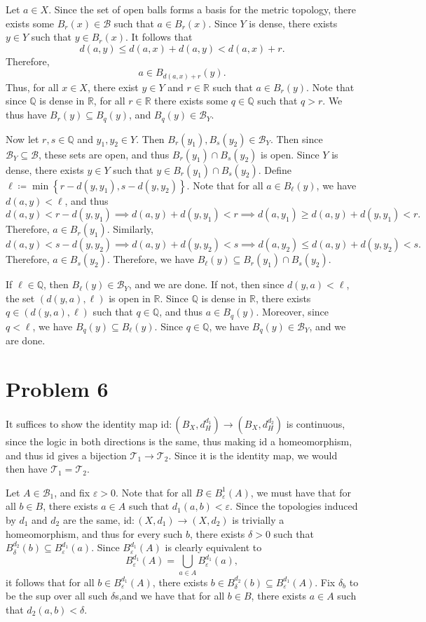 \documentclass[11pt, letterpaper]{article}
\begin{document}
Let $a\in X$. Since the set of open balls forms a basis for the metric topology, there exists some $B_r(x)\in \mathcal{B} $ such that $a\in B_r(x)$. Since $Y$ is dense, there exists $y\in Y$ such that $y\in B_r(x)$. It follows that
\[
	d(a,y)\leq d(a,x)+d(a,y)<d(a,x)+r
.\]
Therefore,
\[
	a\in B_{d(a,x)+r} (y)
.\]
Thus, for all $x\in X$, there exist $y\in Y$ and $r\in\mathbb{R} $ such that $a\in B_r(y)$. Note that since $\mathbb{Q} $ is dense in $\mathbb{R} $, for all $r\in \mathbb{R} $ there exists some $q\in\mathbb{Q} $ such that $q>r$. We thus have $B_r(y)\subseteq B_q(y)$, and $B_q(y)\in \mathcal{B}_Y$.

Now let $r,s\in\mathbb{Q} $ and $y_1,y_2\in Y$. Then $B_r(y_1),B_s(y_2)\in \mathcal{B} _Y$. Then since $\mathcal{B}_Y \subseteq \mathcal{B} $, these sets are open, and thus $B_r(y_1)\cap B_s(y_2)$ is open. Since $Y$ is dense, there exists $y\in Y$ such that $y\in B_r(y_1)\cap B_s(y_2)$. Define $\ell \coloneqq \min \left\{ r-d(y,y_1),s-d(y,y_2) \right\} $. Note that for all $a\in B_\ell (y)$, we have $d(a,y)<\ell $, and thus
\[
	d(a,y)<r-d(y,y_1)\implies d(a,y)+d(y,y_1)<r\implies d(a,y_1)\geq d(a,y)+d(y,y_1)<r
.\]
Therefore, $a\in B_r(y_1)$. Similarly,
\[
	d(a,y)<s-d(y,y_2)\implies d(a,y)+d(y,y_2)<s\implies d(a,y_2)\leq d(a,y)+d(y,y_2)<s
.\]
Therefore, $a\in B_s(y_2)$. Therefore, we have $B_\ell (y)\subseteq B_r(y_1)\cap B_s(y_2)$.

If $\ell \in\mathbb{Q} $, then $B_\ell (y)\in \mathcal{B}_Y$, and we are done. If not, then since $d(y,a)<\ell $, the set $(d(y,a),\ell )$ is open in $\mathbb{R} $. Since $\mathbb{Q} $ is dense in $\mathbb{R} $, there exists $q\in (d(y,a),\ell )$ such that $q\in\mathbb{Q} $, and thus $a\in B_q(y)$. Moreover, since $q<\ell $, we have $B_q(y)\subseteq B_\ell (y)$. Since $q\in\mathbb{Q} $, we have $B_q(y)\in \mathcal{B}_Y$, and we are done.
\section*{Problem 6}
It suffices to show the identity map $\mathrm{id} : \left(B_X,d_H^{d_1} \right) \to \left( B_X,d_H^{d_2}  \right) $ is continuous, since the logic in both directions is the same, thus making $\mathrm{id} $ a homeomorphism, and thus $\mathrm{id} $ gives a bijection $\mathcal{T}_1 \to \mathcal{T}_2$. Since it is the identity map, we would then have $\mathcal{T}_1 =\mathcal{T} _2$.

Let $A\in \mathcal{B}_1$, and fix $\varepsilon >0$. Note that for all $B\in B_\varepsilon^1(A)$, we must have that for all $b\in B$, there exists $a\in A$ such that $d_1(a,b)<\varepsilon $. Since the topologies induced by $d_1$ and $d_2$ are the same, $\mathrm{id} : (X,d_1) \to (X,d_2)$ is trivially a homeomorphism, and thus for every such $b$, there exists $\delta >0$ such that $B_\delta^{d_2} (b)\subseteq B_\varepsilon^{d_1} (a)$. Since $B_\varepsilon^{d_1} (A)$ is clearly equivalent to
\[
	B_\varepsilon^{d_1} (A)=\bigcup_{a\in A} B_\varepsilon^{d_1} (a)
,\]
it follows that for all $b\in B_\varepsilon^{d_1} (A)$, there exists $b\in B_\delta^{d_2} (b)\subseteq B_\varepsilon ^{d_1} (A)$. Fix $\delta_b$ to be the sup over all such $\delta $s,and we have that for all $b\in B$, there exists $a\in A$ such that $d_2(a,b)<\delta$.
\end{document}
